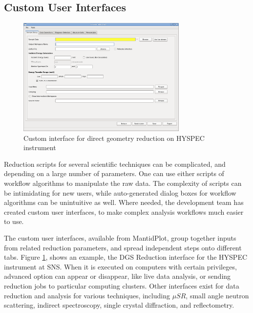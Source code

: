 \documentclass{elsarticle}
\begin{document}
\subsection{Custom User Interfaces}
\begin{figure}[!ht]
\centerline{\includegraphics[width=0.75\textwidth]{Hyspec.png}}
\caption{Custom interface for direct geometry reduction on HYSPEC instrument}
\label{fig:Hyspec}
\end{figure}
Reduction scripts for several scientific techniques can be complicated, and depending on a large number of parameters. One can use either scripts of workflow algorithms to manipulate the raw data. The complexity of scripts can be intimidating for new users, while auto-generated dialog boxes for workflow algorithms can be unintuitive as well. Where needed, the development team has created custom user interfaces, to make complex analysis workflows much easier to use.

The custom user interfaces, available from MantidPlot, group together inputs from related reduction parameters, and spread independent steps onto different tabs. Figure \ref{fig:Hyspec}, shows an example, the DGS Reduction interface for the HYSPEC instrument at SNS. When it is executed on computers with certain privileges, advanced option can appear or disappear, like live data analysis, or sending reduction jobs to particular computing clusters.
Other interfaces exist for data reduction and analysis for various techniques, including $\mu SR$\cite{musr}, small angle neutron scattering, indirect spectroscopy, single crystal diffraction, and reflectometry.
\end{document}
